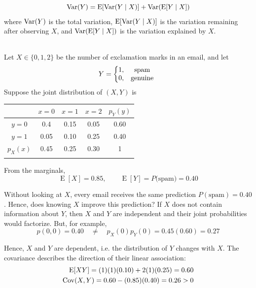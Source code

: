 \begin{theorem}
    \begin{equation}\label{eq:lawtotalvar}
        \operatorname{Var}(Y) = \operatorname{E} [\operatorname{Var}(Y \mid X)] + \operatorname{Var}(\operatorname{E}[Y \mid X])
    \end{equation}
where $\operatorname{Var}(Y)$ is the total variation, $\operatorname{E} [\operatorname{Var}(Y \mid X)]$ is the variation remaining after observing $X$, and $\operatorname{Var}(\operatorname{E}[Y \mid X])$ is the variation explained by $X$.
\end{theorem}


\begin{example}\leavevmode \\
Let $X \in \{0,1,2\}$ be the number of exclamation marks in an email, and let
\begin{equation*}
Y=\left\{\begin{array}{@{}c@{}c}
1,&\quad \mbox{spam}\\
0,&\quad \mbox{genuine}
\end{array}
\right.
\end{equation*}
Suppose the joint distribution of $(X,Y)$ is
\begin{table}[h]
    \centering
    \begin{tabular}{ccccc}\toprule
         &$x=0$& $x=1$&$x=2$& $p_Y(y)$\\\midrule
         $y=0$&   0.4& 0.15&0.05& 0.60\\
         $y=1$&   0.05& 0.10&0.25& 0.40\\
         \midrule
         $p_X(x)$& 0.45& 0.25& 0.30&1\\ 
         \botrule
    \end{tabular}
\end{table}

From the marginals,
\begin{equation*}
    \operatorname{E}[X] =0.85, \quad \quad \operatorname{E}[Y]=P(\text{spam)}=0.40 
\end{equation*}

Without looking at $X$, every email receives the same prediction $P(\text{spam})=0.40$. Hence, does knowing $X$ improve this prediction? If $X$ does not contain information about $Y$, then $X$ and $Y$ are independent and their joint probabilities would factorize. But, for example,
\begin{equation*}
    p(0,0)=0.40 \quad \neq \quad p_X(0)p_Y(0)=0.45(0.60)=0.27
\end{equation*}

Hence, $X$ and $Y$ are dependent, i.e. the distribution of $Y$ changes with $X$. The covariance describes the direction of their linear association:
\begin{align*}
\operatorname{E}[XY] = (1)(1)(0.10)+2(1)(0.25)=0.60\\
\operatorname{Cov}(X,Y) = 0.60-(0.85)(0.40)=0.26>0
\end{align*}


\end{example}
